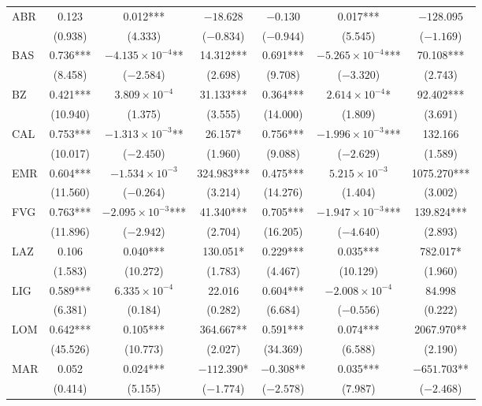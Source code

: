 \documentclass[12pt]{article}
\begin{document}
\begin{longtable}{@{}lcccccc@{}}
        ABR & 0.123 & 0.012*** & $-18.628$ & $-0.130$ & 0.017*** & $-128.095$ \\ 
         & (0.938) & (4.333) & ($-0.834$) & ($-0.944$) & (5.545) & ($-1.169$) \\ 
        BAS & 0.736*** & $-4.135 \times 10^{-4}$** & 14.312*** & 0.691*** & $-5.265 \times 10^{-4}$*** & 70.108*** \\ 
         & (8.458) & ($-2.584$) & (2.698) & (9.708) & ($-3.320$) & (2.743) \\ 
        BZ & 0.421*** & $3.809 \times 10^{-4}$ & 31.133*** & 0.364*** & $2.614 \times 10^{-4}$* & 92.402*** \\ 
         & (10.940) & (1.375) & (3.555) & (14.000) & (1.809) & (3.691) \\ 
        CAL & 0.753*** & $-1.313 \times 10^{-3}$** & 26.157* & 0.756*** & $-1.996 \times 10^{-3}$*** & 132.166 \\ 
         & (10.017) & ($-2.450$) & (1.960) & (9.088) & ($-2.629$) & (1.589) \\ 
        EMR & 0.604*** & $-1.534 \times 10^{-3}$ & 324.983*** & 0.475*** & $5.215 \times 10^{-3}$ & 1075.270*** \\ 
         & (11.560) & ($-0.264$) & (3.214) & (14.276) & (1.404) & (3.002) \\ 
        FVG & 0.763*** & $-2.095 \times 10^{-3}$*** & 41.340*** & 0.705*** & $-1.947 \times 10^{-3}$*** & 139.824*** \\ 
         & (11.896) & ($-2.942$) & (2.704) & (16.205) & ($-4.640$) & (2.893) \\ 
        LAZ & 0.106 & 0.040*** & 130.051* & 0.229*** & 0.035*** & 782.017* \\ 
         & (1.583) & (10.272) & (1.783) & (4.467) & (10.129) & (1.960) \\ 
        LIG & 0.589*** & $6.335 \times 10^{-4}$ & 22.016 & 0.604*** & $-2.008 \times 10^{-4}$ & 84.998 \\ 
         & (6.381) & (0.184) & (0.282) & (6.684) & ($-0.556$) & (0.222) \\ 
        LOM & 0.642*** & 0.105*** & 364.667** & 0.591*** & 0.074*** & 2067.970** \\ 
         & (45.526) & (10.773) & (2.027) & (34.369) & (6.588) & (2.190) \\ 
        MAR & 0.052 & 0.024*** & $-112.390$* & $-0.308$** & 0.035*** & $-651.703$** \\ 
         & (0.414) & (5.155) & ($-1.774$) & ($-2.578$) & (7.987) & ($-2.468$) \\ 

\end{longtable}
\end{document}
